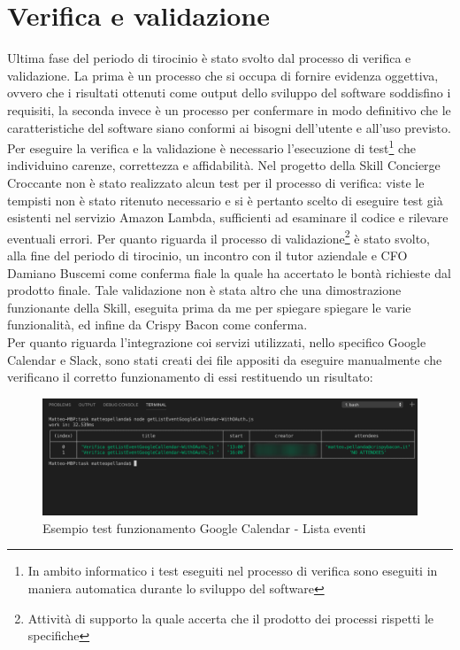 \newpage
\section{Verifica e validazione}
\label{cap:verifica_validazione}
Ultima fase del periodo di tirocinio è stato svolto dal processo di verifica e validazione. La prima è un processo che si occupa di fornire evidenza oggettiva, ovvero che i risultati ottenuti come output dello sviluppo del software soddisfino i requisiti, la seconda invece è un processo per confermare in modo definitivo che le caratteristiche del software siano conformi ai bisogni dell'utente e all'uso previsto.
Per eseguire la verifica e la validazione è necessario l'esecuzione di test\footnote{In ambito informatico i test eseguiti nel processo di verifica sono eseguiti in maniera automatica durante lo sviluppo del software} che individuino carenze, correttezza e affidabilità. Nel progetto della Skill Concierge Croccante non è stato realizzato alcun test per il processo di verifica: viste le tempisti non è stato ritenuto necessario e si è pertanto scelto di eseguire test già esistenti nel servizio Amazon Lambda, sufficienti ad esaminare il codice e rilevare eventuali errori. Per quanto riguarda il processo di validazione\footnote{Attività di supporto la quale accerta che il prodotto dei processi rispetti le specifiche} è stato svolto, alla fine del periodo di tirocinio, un incontro  con il tutor aziendale e CFO Damiano Buscemi come conferma fiale la quale ha accertato le bontà richieste dal prodotto finale. Tale validazione non è stata altro che una dimostrazione funzionante della Skill, eseguita prima da me per spiegare spiegare le varie funzionalità, ed infine da Crispy Bacon come conferma.
\\[0.5cm]
\noindent Per quanto riguarda l'integrazione coi servizi utilizzati, nello specifico Google Calendar e Slack, sono stati creati dei file appositi da eseguire manualmente che verificano il corretto funzionamento di essi restituendo un risultato:
\begin{figure}[H]
	\includegraphics[width=13cm]{immagini/test-googleCalendar.png}
	\caption{\label{fig:test_googleCalendar}Esempio test funzionamento Google Calendar - Lista eventi}
\end{figure}
